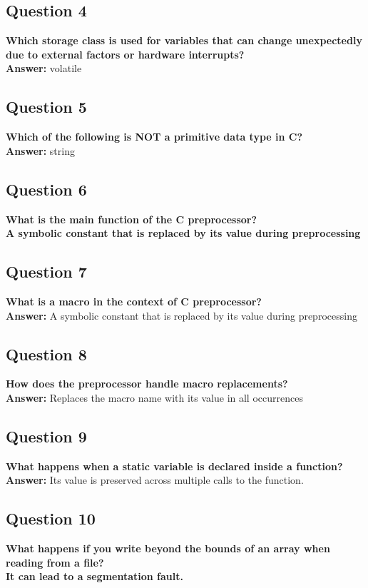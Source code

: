 \documentclass[11pt,parskip]{scrartcl}
\begin{document}
\subsection*{Question 4}
\textbf{Which storage class is used for variables that can change unexpectedly due to external factors or hardware interrupts?} \\
\textbf{Answer:} volatile

\subsection*{Question 5} 
\textbf{Which of the following is NOT a primitive data type in C?} \\
\textbf{Answer:} string

\subsection*{Question 6}
\textbf{What is the main function of the C preprocessor?} \\
\textbf{A symbolic constant that is replaced by its value during preprocessing}

\subsection*{Question 7}
\textbf{What is a macro in the context of C preprocessor?} \\
\textbf{Answer:} A symbolic constant that is replaced by its value during preprocessing

\subsection*{Question 8}
\textbf{How does the preprocessor handle macro replacements?} \\
\textbf{Answer:} Replaces the macro name with its value in all occurrences

\subsection*{Question 9}
\textbf{What happens when a static variable is declared inside a function?} \\
\textbf{Answer:} Its value is preserved across multiple calls to the function.


\subsection*{Question 10} 
\textbf{What happens if you write beyond the bounds of an array when reading from a file?} \\
\textbf{It can lead to a segmentation fault.}
\end{document}
